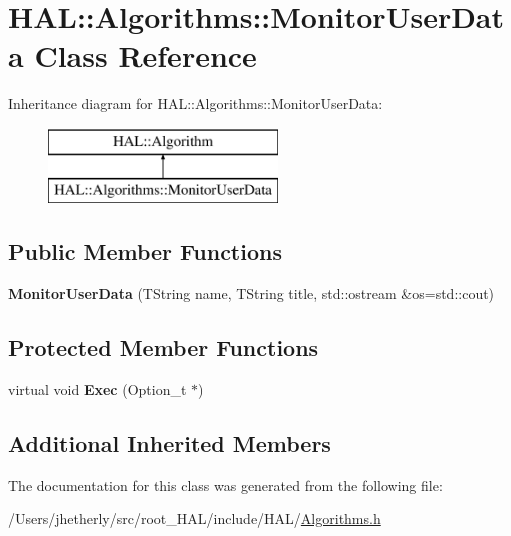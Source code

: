 \hypertarget{class_h_a_l_1_1_algorithms_1_1_monitor_user_data}{\section{H\-A\-L\-:\-:Algorithms\-:\-:Monitor\-User\-Data Class Reference}
\label{class_h_a_l_1_1_algorithms_1_1_monitor_user_data}
}
Inheritance diagram for H\-A\-L\-:\-:Algorithms\-:\-:Monitor\-User\-Data\-:\begin{figure}[H]
\begin{center}
\leavevmode
\includegraphics[height=2.000000cm]{class_h_a_l_1_1_algorithms_1_1_monitor_user_data}
\end{center}
\end{figure}
\subsection*{Public Member Functions}
\begin{DoxyCompactItemize}
\item 
\hypertarget{class_h_a_l_1_1_algorithms_1_1_monitor_user_data_acd4eeebf53037457c4b0e2095934a723}{{\bfseries Monitor\-User\-Data} (T\-String name, T\-String title, std\-::ostream \&os=std\-::cout)}\label{class_h_a_l_1_1_algorithms_1_1_monitor_user_data_acd4eeebf53037457c4b0e2095934a723}

\end{DoxyCompactItemize}
\subsection*{Protected Member Functions}
\begin{DoxyCompactItemize}
\item 
\hypertarget{class_h_a_l_1_1_algorithms_1_1_monitor_user_data_aea4229dea8ffbd7edfa8a4108e72205c}{virtual void {\bfseries Exec} (Option\-\_\-t $\ast$)}\label{class_h_a_l_1_1_algorithms_1_1_monitor_user_data_aea4229dea8ffbd7edfa8a4108e72205c}

\end{DoxyCompactItemize}
\subsection*{Additional Inherited Members}


The documentation for this class was generated from the following file\-:\begin{DoxyCompactItemize}
\item 
/\-Users/jhetherly/src/root\-\_\-\-H\-A\-L/include/\-H\-A\-L/\hyperlink{_algorithms_8h}{Algorithms.\-h}\end{DoxyCompactItemize}
